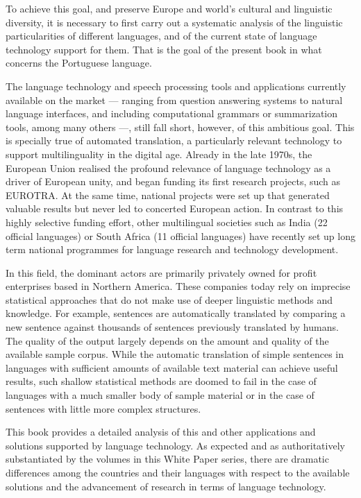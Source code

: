 \begin{multicols}{2}
  To achieve this goal, and preserve Europe and world’s cultural and linguistic diversity, 
  it is ne\-cessa\-ry to first carry out a systematic analysis of the linguistic particularities of different languages, 
  and of the current state of language technology support for them. That is the goal
  of the present book in what concerns the Portuguese language.

  The language technology and speech processing tools and applications currently available on the market --- ranging from
  question answering systems to natural language interfaces, and including computational grammars or summarization tools, among many others ---, 
  still fall short, however, of this ambitious goal. This is specially true of automated translation, a particularly relevant techno\-lo\-gy to support multilinguality
  in the digital age. Already in the late 1970s, the European Union realised the profound relevance of language technology as a driver of European unity, 
  and began funding its first research projects, such as EUROTRA. At the same time, national projects were set up that generated valuable results but never led to concerted European action. 
  In contrast to this highly selective funding effort, other multilingual societies such as India (22 official languages) or South Africa (11 offi\-cial languages) have recently set up long term national programmes for language research and technology development.

  In this field, the dominant actors are primarily privately owned for profit enterprises based in Northern America. These companies today rely on imprecise statistical approaches that do not make use of deeper linguistic methods and knowledge. For example, sentences are automatically translated by comparing a new sentence against thousands of sentences previously translated by humans. The qua\-li\-ty of the output largely depends on the amount and quality of the available sample corpus. While the automatic translation of simple sentences in languages with sufficient amounts of available text material can achieve useful results, such shallow statistical methods are doomed to fail in the case of languages with a much smaller body of sample material or in the case of sentences with little more complex stru\-ctu\-res.

  This book provides a detailed analysis of this and other applications and solutions
  supported by language technology. As expected and as authoritatively substantiated by the volumes in 
  this White Paper series, there are dramatic differences among the countries and their languages with respect
  to the available solutions and the advancement of research in terms of language technology.


\end{multicols}
